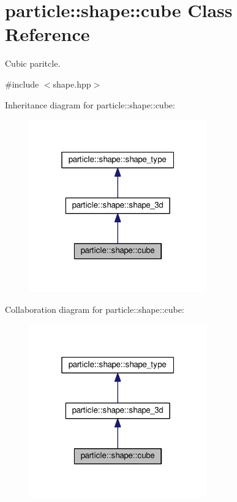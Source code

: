 \hypertarget{classparticle_1_1shape_1_1cube}{}\section{particle\+:\+:shape\+:\+:cube Class Reference}
\label{classparticle_1_1shape_1_1cube}


Cubic paritcle.  




{\ttfamily \#include $<$shape.\+hpp$>$}



Inheritance diagram for particle\+:\+:shape\+:\+:cube\+:\nopagebreak
\begin{figure}[H]
\begin{center}
\leavevmode
\includegraphics[width=217pt]{d6/dc4/classparticle_1_1shape_1_1cube__inherit__graph}
\end{center}
\end{figure}


Collaboration diagram for particle\+:\+:shape\+:\+:cube\+:\nopagebreak
\begin{figure}[H]
\begin{center}
\leavevmode
\includegraphics[width=217pt]{d9/d6b/classparticle_1_1shape_1_1cube__coll__graph}
\end{center}
\end{figure}
